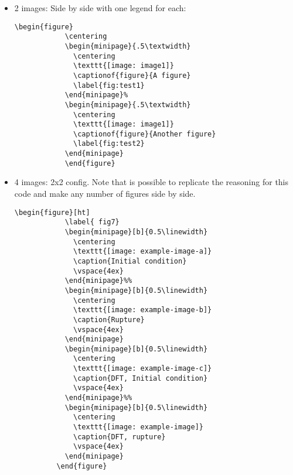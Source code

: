 \begin{itemize}
    \item 2 images: Side by side with one legend for each:
    \begin{lstlisting}[language=Tex, numbers=none]
        \begin{figure}
            \centering
            \begin{minipage}{.5\textwidth}
              \centering
              \texttt{[image: image1]}
              \captionof{figure}{A figure}
              \label{fig:test1}
            \end{minipage}%
            \begin{minipage}{.5\textwidth}
              \centering
              \texttt{[image: image1]}
              \captionof{figure}{Another figure}
              \label{fig:test2}
            \end{minipage}
            \end{figure}
    \end{lstlisting}
    \item 4 images: 2x2 config. Note that is possible to replicate the reasoning for this code and make any number of figures side by side.
    \begin{lstlisting}[language = Tex, numbers = none]
        \begin{figure}[ht] 
            \label{ fig7} 
            \begin{minipage}[b]{0.5\linewidth}
              \centering
              \texttt{[image: example-image-a]} 
              \caption{Initial condition} 
              \vspace{4ex}
            \end{minipage}%%
            \begin{minipage}[b]{0.5\linewidth}
              \centering
              \texttt{[image: example-image-b]} 
              \caption{Rupture} 
              \vspace{4ex}
            \end{minipage} 
            \begin{minipage}[b]{0.5\linewidth}
              \centering
              \texttt{[image: example-image-c]} 
              \caption{DFT, Initial condition} 
              \vspace{4ex}
            \end{minipage}%% 
            \begin{minipage}[b]{0.5\linewidth}
              \centering
              \texttt{[image: example-image]} 
              \caption{DFT, rupture} 
              \vspace{4ex}
            \end{minipage} 
          \end{figure}
    \end{lstlisting}
\end{itemize}



